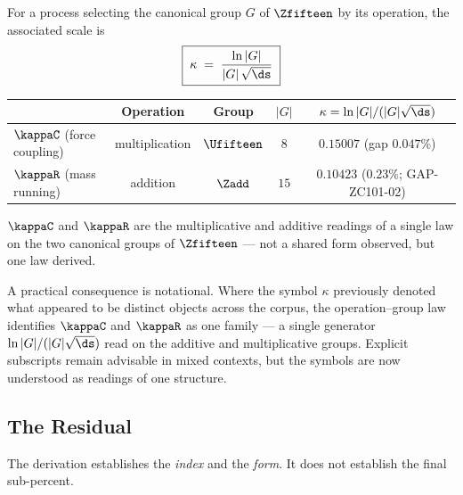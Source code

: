 \documentclass[12pt, a4paper]{article}
\begin{document}
\begin{formalbox}[title={THM-ZC101-03: The Operation--Group Law for $\kappa$}]
For a process selecting the canonical group $G$ of $\Zfifteen$ by its operation,
the associated scale is
\begin{equation*}
  \boxed{\;\kappa \;=\; \frac{\ln|G|}{|G|\,\sqrt{\ds}}\;}
\end{equation*}
\begin{center}
\renewcommand{\arraystretch}{1.3}
\setlength{\tabcolsep}{4pt}\small
\begin{tabular}{lcccc}
\toprule
& \textbf{Operation} & \textbf{Group} & $|G|$ & $\kappa=\ln|G|/(|G|\sqrt{\ds})$ \\
\midrule
$\kappaC$ (force coupling)  & multiplication & $\Ufifteen$ & $8$  & $0.15007$ (gap $0.047\%$) \\
$\kappaR$ (mass running)    & addition       & $\Zadd$     & $15$ & $0.10423$ ($0.23\%$; GAP-ZC101-02) \\
\bottomrule
\end{tabular}
\end{center}
$\kappaC$ and $\kappaR$ are the multiplicative and additive readings of a single
law on the two canonical groups of $\Zfifteen$ --- not a shared form observed,
but one law derived.
\end{formalbox}

A practical consequence is notational. Where the symbol $\kappa$ previously
denoted what appeared to be distinct objects across the corpus, the
operation--group law identifies $\kappaC$ and $\kappaR$ as one family --- a single
generator $\ln|G|/(|G|\sqrt{\ds})$ read on the additive and multiplicative
groups. Explicit subscripts remain advisable in mixed contexts, but the symbols
are now understood as readings of one structure.


\subsection{The Residual}
\label{sec:residual-zc101}
The derivation establishes the \emph{index} and the \emph{form}. It does not
establish the final sub-percent.
\end{document}

